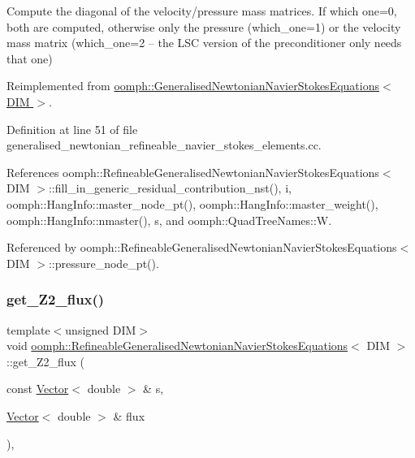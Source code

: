 Compute the diagonal of the velocity/pressure mass matrices. If which one=0, both are computed, otherwise only the pressure (which\+\_\+one=1) or the velocity mass matrix (which\+\_\+one=2 -- the L\+SC version of the preconditioner only needs that one) 

Reimplemented from \hyperlink{classoomph_1_1GeneralisedNewtonianNavierStokesEquations_a6a7432333fec18d7e68efc3f99a02f16}{oomph\+::\+Generalised\+Newtonian\+Navier\+Stokes\+Equations$<$ D\+I\+M $>$}.



Definition at line 51 of file generalised\+\_\+newtonian\+\_\+refineable\+\_\+navier\+\_\+stokes\+\_\+elements.\+cc.



References oomph\+::\+Refineable\+Generalised\+Newtonian\+Navier\+Stokes\+Equations$<$ D\+I\+M $>$\+::fill\+\_\+in\+\_\+generic\+\_\+residual\+\_\+contribution\+\_\+nst(), i, oomph\+::\+Hang\+Info\+::master\+\_\+node\+\_\+pt(), oomph\+::\+Hang\+Info\+::master\+\_\+weight(), oomph\+::\+Hang\+Info\+::nmaster(), s, and oomph\+::\+Quad\+Tree\+Names\+::W.



Referenced by oomph\+::\+Refineable\+Generalised\+Newtonian\+Navier\+Stokes\+Equations$<$ D\+I\+M $>$\+::pressure\+\_\+node\+\_\+pt().

\mbox{\label{classoomph_1_1RefineableGeneralisedNewtonianNavierStokesEquations_a6b9bbaa731432a9a9fe13e53095a78d8}} 
\subsubsection{\texorpdfstring{get\+\_\+\+Z2\+\_\+flux()}{get\_Z2\_flux()}}
{\footnotesize\ttfamily template$<$unsigned D\+IM$>$ \\
void \hyperlink{classoomph_1_1RefineableGeneralisedNewtonianNavierStokesEquations}{oomph\+::\+Refineable\+Generalised\+Newtonian\+Navier\+Stokes\+Equations}$<$ D\+IM $>$\+::get\+\_\+\+Z2\+\_\+flux (\begin{DoxyParamCaption}\item[{const \hyperlink{classoomph_1_1Vector}{Vector}$<$ double $>$ \&}]{s,  }\item[{\hyperlink{classoomph_1_1Vector}{Vector}$<$ double $>$ \&}]{flux }\end{DoxyParamCaption})\hspace{0.3cm}{\ttfamily [inline]}, {\ttfamily [virtual]}}



